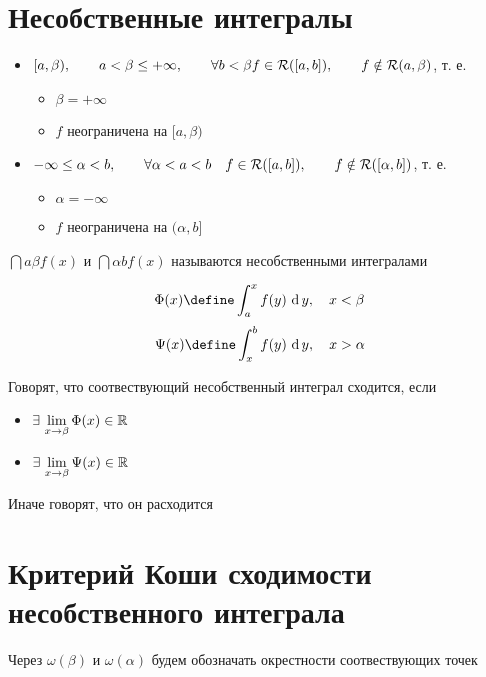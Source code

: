 \section{Несобственные интегралы}

\begin{definition}
    \begin{itemize}
    	\item $ [a, \beta), \qquad a < \beta \le +\infty, \qquad \forall b < \beta f \in \mathcal{R}([a, b]), \qquad f \notin \mathcal{R}(a, \beta) $, т. е.
        \begin{itemize}
        	\item $ \beta = +\infty $
            \item $ f $ неограничена на $ [a, \beta) $
        \end{itemize}
        \item $ -\infty \le \alpha < b, \qquad \forall \alpha < a < b \quad f \in \mathcal{R}([a, b]), \qquad f \notin \mathcal{R}([\alpha, b]) $, т. е.
        \begin{itemize}
        	\item $ \alpha = -\infty $
            \item $ f $ неограничена на $ (\alpha, b] $
        \end{itemize}
    \end{itemize}
    $ \dint{a}\beta{f(x)} $ и $ \dint\alpha{b}{f(x)} $ называются несобственными интегралами
\end{definition}

$$ \Phi(x) \define \dint[y]{a}x{f(y)}, \quad x < \beta $$
$$ \Psi(x) \define \dint[y]{x}b{f(y)}, \quad x > \alpha $$

\begin{definition}
    Говорят, что соотвествующий несобственный интеграл сходится, если
    \begin{itemize}
        \item $ \exists\, \lim\limits_{x \to \beta} \Phi(x) \in \mathbb{R} $
        \item $ \exists\, \lim\limits_{x \to \beta} \Psi(x) \in \mathbb{R} $
    \end{itemize}
    Иначе говорят, что он расходится
\end{definition}

\section{Критерий Коши сходимости несобственного интеграла}

Через $ \omega(\beta) $ и $ \omega(\alpha) $ будем обозначать окрестности соотвествующих точек

